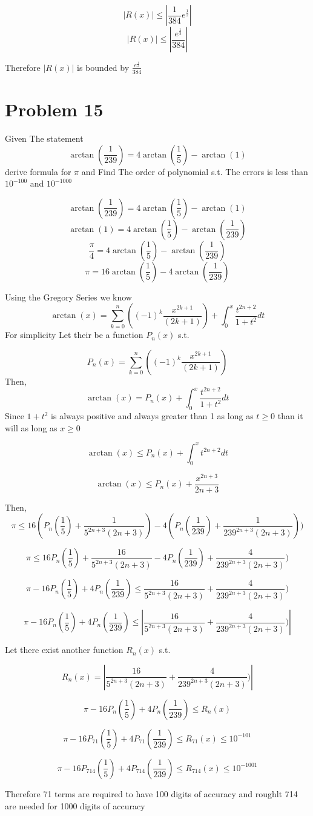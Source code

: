 \documentclass[]{article}
\begin{document}
	\[|R(x)| \le |\frac{1}{384}e^{\frac{1}{2}}|\]
	\[|R(x)| \le |\frac{e^{\frac{1}{2}}}{384}|\]
	
	Therefore $|R(x)|$ is bounded by $\frac{e^{\frac{1}{2}}}{384}$
	
	\section*{Problem 15}
	
	Given The statement \[\arctan(\frac{1}{239}) = 4\arctan(\frac{1}{5}) - \arctan(1)\]
	derive formula for $\pi$ and Find The order of polynomial s.t. The errors is less than $10^{-100}$ and $10^{-1000}$
	
	\[\arctan(\frac{1}{239}) = 4\arctan(\frac{1}{5}) - \arctan(1)\]
	\[ \arctan(1) = 4\arctan(\frac{1}{5}) - \arctan(\frac{1}{239})\]
	\[ \frac{\pi}{4} = 4\arctan(\frac{1}{5}) - \arctan(\frac{1}{239})\]
	\[ \pi = 16\arctan(\frac{1}{5}) - 4\arctan(\frac{1}{239})\]
	
	Using the Gregory Series we know
	\[\arctan(x) = \sum_{k=0}^{n}((-1)^k\frac{x^{2k+1}}{(2k+1)})+\int_{0}^{x}\frac{t^{2n+2}}{1+t^2}dt\]
	For simplicity Let their be a function $P_n(x)$ s.t.
	
	\[P_n(x) = \sum_{k=0}^{n}((-1)^k\frac{x^{2k+1}}{(2k+1)})\]
	Then,
	\[\arctan(x) = P_n(x)+\int_{0}^{x}\frac{t^{2n+2}}{1+t^2}dt\]
	Since $1+t^2$ is always positive and always greater than 1 as long as $t \ge 0$ than it will as long as $x \ge 0$ 
	
	\[\arctan(x) \le P_n(x)+\int_{0}^{x}t^{2n+2}dt\]
	
	\[\arctan(x) \le P_n(x)+\frac{x^{2n+3}}{2n+3}\]
	
	Then,
	\[ \pi \le 16(P_n(\frac{1}{5})+\frac{1}{5^{2n+3}(2n+3)}) - 4(P_n(\frac{1}{239})+\frac{1}{239^{2n+3}(2n+3)}))\]
	
	\[ \pi \le 16P_n(\frac{1}{5})+\frac{16}{5^{2n+3}(2n+3)} - 4P_n(\frac{1}{239})+\frac{4}{239^{2n+3}(2n+3)})\]
	
	\[ \pi - 16P_n(\frac{1}{5}) + 4P_n(\frac{1}{239}) \le \frac{16}{5^{2n+3}(2n+3)} +\frac{4}{239^{2n+3}(2n+3)})\]
	
	\[ \pi - 16P_n(\frac{1}{5}) + 4P_n(\frac{1}{239}) \le |\frac{16}{5^{2n+3}(2n+3)} +\frac{4}{239^{2n+3}(2n+3)})|\]
	
	Let there exist another function $R_n(x)$ s.t.
	
	\[R_n(x) = |\frac{16}{5^{2n+3}(2n+3)} +\frac{4}{239^{2n+3}(2n+3)})|\]
	 
	\[ \pi - 16P_n(\frac{1}{5}) + 4P_n(\frac{1}{239}) \le R_n(x)\]
	
	\[ \pi - 16P_{71}(\frac{1}{5}) + 4P_{71}(\frac{1}{239}) \le R_{71}(x) \le 10^{-101}\]
	
	\[ \pi - 16P_{714}(\frac{1}{5}) + 4P_{714}(\frac{1}{239}) \le R_{714}(x) \le 10^{-1001}\]
	
	Therefore 71 terms are required to have 100 digits of accuracy and roughlt 714 are needed for 1000 digits of accuracy
\end{document}
